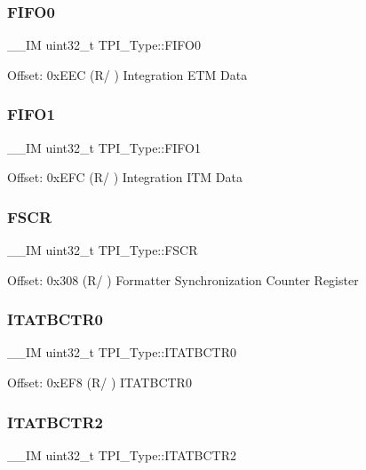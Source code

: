 \subsubsection{\texorpdfstring{FIFO0}{FIFO0}}
{\footnotesize\ttfamily \+\_\+\+\_\+\+IM uint32\+\_\+t T\+P\+I\+\_\+\+Type\+::\+F\+I\+F\+O0}

Offset\+: 0x\+E\+EC (R/ ) Integration E\+TM Data \mbox{\label{structTPI__Type_a061372fcd72f1eea871e2d9c1be849bc}} 
\subsubsection{\texorpdfstring{FIFO1}{FIFO1}}
{\footnotesize\ttfamily \+\_\+\+\_\+\+IM uint32\+\_\+t T\+P\+I\+\_\+\+Type\+::\+F\+I\+F\+O1}

Offset\+: 0x\+E\+FC (R/ ) Integration I\+TM Data \mbox{\label{structTPI__Type_ad6901bfd8a0089ca7e8a20475cf494a8}} 
\subsubsection{\texorpdfstring{FSCR}{FSCR}}
{\footnotesize\ttfamily \+\_\+\+\_\+\+IM uint32\+\_\+t T\+P\+I\+\_\+\+Type\+::\+F\+S\+CR}

Offset\+: 0x308 (R/ ) Formatter Synchronization Counter Register \mbox{\label{structTPI__Type_aaa573b2e073e76e93c51ecec79c616d0}} 
\subsubsection{\texorpdfstring{ITATBCTR0}{ITATBCTR0}}
{\footnotesize\ttfamily \+\_\+\+\_\+\+IM uint32\+\_\+t T\+P\+I\+\_\+\+Type\+::\+I\+T\+A\+T\+B\+C\+T\+R0}

Offset\+: 0x\+E\+F8 (R/ ) I\+T\+A\+T\+B\+C\+T\+R0 \mbox{\label{structTPI__Type_ab358319b969d3fed0f89bbe33e9f1652}} 
\subsubsection{\texorpdfstring{ITATBCTR2}{ITATBCTR2}}
{\footnotesize\ttfamily \+\_\+\+\_\+\+IM uint32\+\_\+t T\+P\+I\+\_\+\+Type\+::\+I\+T\+A\+T\+B\+C\+T\+R2}

